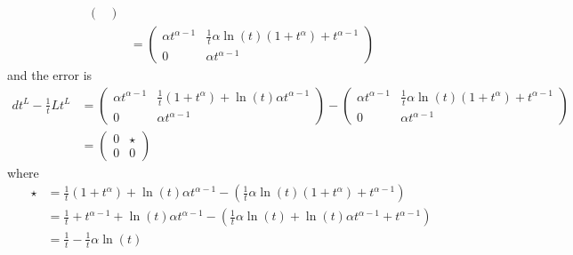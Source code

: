 \begin{rem}
\begin{s-rem}
\begin{align*}
\begin{pmatrix}
      \end{pmatrix}
      \\&= 
      \begin{pmatrix}
        \alpha t^{\alpha-1} & \frac{1}{t}\alpha\ln(t)(1+t^\alpha)+t^{\alpha-1}
        \\ 0 & \alpha t^{\alpha-1}
      \end{pmatrix}
    \end{align*}
    and the error is
    \begin{align*}
      dt^L-\frac{1}{t}Lt^L
      &=
      \begin{pmatrix}
        \alpha t^{\alpha-1} & \frac{1}{t}(1+t^\alpha)+\ln(t)\alpha t^{\alpha-1}
        \\ 0 & \alpha t^{\alpha-1}
      \end{pmatrix}
      -
      \begin{pmatrix}
        \alpha t^{\alpha-1} & \frac{1}{t}\alpha\ln(t)(1+t^\alpha)+t^{\alpha-1}
        \\ 0 & \alpha t^{\alpha-1}
      \end{pmatrix}
      \\&=
      \begin{pmatrix}
        0 & \star
        \\ 0 & 0
      \end{pmatrix}
    \end{align*}
    where
    \begin{align*}
      \star &= 
        \frac{1}{t}(1+t^\alpha)+\ln(t)\alpha t^{\alpha-1} -
        (\frac{1}{t}\alpha\ln(t)(1+t^\alpha)+t^{\alpha-1})
      \\&=\frac{1}{t}+t^{\alpha-1}+\ln(t)\alpha t^{\alpha-1} -
        (\frac{1}{t}\alpha\ln(t)+\ln(t)\alpha t^{\alpha-1}+t^{\alpha-1})
      \\&=\frac{1}{t} - \frac{1}{t}\alpha\ln(t)
    \end{align*}
  \end{s-rem}
\end{rem}
